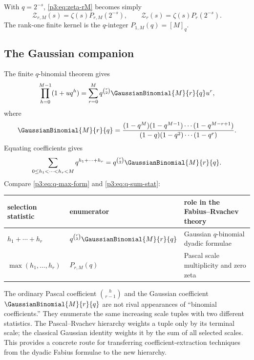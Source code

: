 \documentclass[11pt,oneside]{article}
\theoremstyle{definition}
\theoremstyle{remark}
\begin{document}
With $q=2^{-s}$, \eqref{p3:eq:zeta-rM} becomes simply
\begin{equation}\label{p3:eq:zeta-q-kernel}
  \mathcal Z_{r,M}(s)=\zeta(s)P_{r,M}(2^{-s}),
  \qquad
  \mathcal Z_r(s)=\zeta(s)P_r(2^{-s}).
\end{equation}
The rank-one finite kernel is the $q$-integer $P_{1,M}(q)=[M]_q$.

\subsection{The Gaussian companion}

The finite $q$-binomial theorem gives
\begin{equation}\label{p3:eq:q-binomial-theorem}
 \prod_{h=0}^{M-1}(1+u q^h)
 =\sum_{r=0}^{M}q^{\binom r2}\GaussianBinomial{M}{r}{q} u^r,
\end{equation}
where
\[
 \GaussianBinomial{M}{r}{q}
 =\frac{(1-q^M)(1-q^{M-1})\cdots(1-q^{M-r+1})}
 {(1-q)(1-q^2)\cdots(1-q^r)}.
\]
Equating coefficients gives
\begin{equation}\label{p3:eq:q-sum-stat}
 \sum_{0\le h_1<\cdots<h_r<M}q^{h_1+\cdots+h_r}
 =q^{\binom r2}\GaussianBinomial{M}{r}{q}.
\end{equation}
Compare \eqref{p3:eq:q-max-form} and \eqref{p3:eq:q-sum-stat}:
\begin{center}
\begin{tabular}{@{}lll@{}}
\toprule
selection statistic & enumerator & role in the Fabius--Rvachev theory\\
\midrule
$h_1+\cdots+h_r$ & $q^{\binom r2}\GaussianBinomial{M}{r}{q}$ & Gaussian $q$-binomial dyadic formulae\\
$\max(h_1,\ldots,h_r)$ & $P_{r,M}(q)$ & Pascal scale multiplicity and zero zeta\\
\bottomrule
\end{tabular}
\end{center}

\begin{resultbox}
The ordinary Pascal coefficient $\binom h{r-1}$ and the Gaussian coefficient $\GaussianBinomial{M}{r}{q}$ are not rival appearances of ``binomial coefficients.''  They enumerate the same increasing scale tuples with two different statistics.  The Pascal--Rvachev hierarchy weights a tuple only by its terminal scale; the classical Gaussian identity weights it by the sum of all selected scales.  This provides a concrete route for transferring coefficient-extraction techniques from the dyadic Fabius formulae to the new hierarchy.
\end{resultbox}
\end{document}
